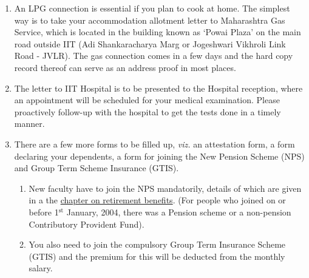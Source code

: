 \documentclass[
  10pt,
  a5paper,
  10pt,
  openany]{amsbook}
\begin{document}
\begin{enumerate}
  The on-campus quarters do not come furnished and you will have to
  furnish it yourself. A home telephone connected to the internal
  exchange will be provided which does not have external call facility.
  You may decide to get a personal landline or mobile phone connection
  either from MTNL or from one of the other private operators. The
  Manager Telephones, whose office is in the Telephone Exchange (Main
  Building) generally would be able to share information of some special
  mobile plans for IIT Bombay Faculty and Staff. Your quarter would also
  have internet facilities connected to the Institute network.

  Please retain your accommodation allotment letter in a safe place, as
  it will serve as proof of address for various purposes; in particular,
  it will come in handy for various purposes like applying for a LPG
  cooking cylinder connection, opening a bank account etc. Keeping a
  scanned copy for easy access is highly recommended, so that printouts
  can be taken on demand.

  For more on housing related matters, please refer to the
  \hyperref[sec:morehousing]{relevant section of the appendix}.
\item
  An LPG connection is essential if you plan to cook at home. The
  simplest way is to take your accommodation allotment letter to
  Maharashtra Gas Service, which is located in the building known as
  `Powai Plaza' on the main road outside IIT (Adi Shankaracharya Marg or
  Jogeshwari Vikhroli Link Road - JVLR). The gas connection comes in a
  few days and the hard copy record thereof can serve as an address
  proof in most places.
\item
  The letter to IIT Hospital is to be presented to the Hospital
  reception, where an appointment will be scheduled for your medical
  examination. Please proactively follow-up with the hospital to get the
  tests done in a timely manner.
\item
  There are a few more forms to be filled up, \emph{viz.} an attestation
  form, a form declaring your dependents, a form for joining the New
  Pension Scheme (NPS) and Group Term Scheme Insurance (GTIS).

  \begin{enumerate}
  \def\labelenumii{\alph{enumii}.}
  \item
    New faculty have to join the NPS mandatorily, details of which are
    given in a the \hyperref[sec:npsnote]{chapter on retirement
    benefits}. (For people who joined on or before 1\(^{\text{st}}\)
    January, 2004, there was a Pension scheme or a non-pension
    Contributory Provident Fund).
  \item
    You also need to join the compulsory Group Term Insurance Scheme
    (GTIS) and the premium for this will be deducted from the monthly
    salary.
  \end{enumerate}


\end{enumerate}
\end{document}
